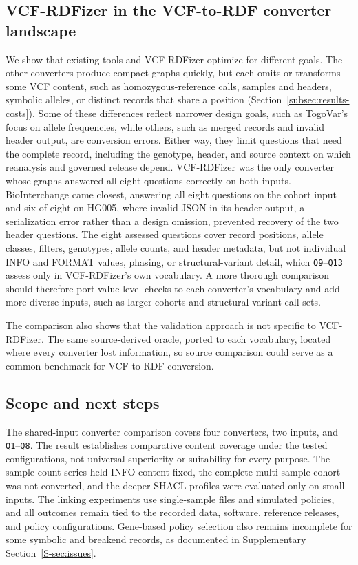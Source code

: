 \documentclass[pdflatex,sn-mathphys-num]{sn-jnl}
\begin{document}
\subsection{VCF-RDFizer in the VCF-to-RDF converter landscape}\label{subsec:other-converters}
We show that existing tools and VCF-RDFizer optimize for different goals.
The other converters produce compact graphs quickly, but each omits or transforms some VCF content, such as homozygous-reference calls, samples and headers, symbolic alleles, or distinct records that share a position (Section~\ref{subsec:results-costs}).
Some of these differences reflect narrower design goals, such as TogoVar's focus on allele frequencies, while others, such as merged records and invalid header output, are conversion errors.
Either way, they limit questions that need the complete record, including the genotype, header, and source context on which reanalysis and governed release depend.
VCF-RDFizer was the only converter whose graphs answered all eight questions correctly on both inputs.
BioInterchange came closest, answering all eight questions on the cohort input and six of eight on HG005, where invalid JSON in its header output, a serialization error rather than a design omission, prevented recovery of the two header questions.
The eight assessed questions cover record positions, allele classes, filters, genotypes, allele counts, and header metadata, but not individual INFO and FORMAT values, phasing, or structural-variant detail, which \texttt{Q9}--\texttt{Q13} assess only in VCF-RDFizer's own vocabulary.
A more thorough comparison should therefore port value-level checks to each converter's vocabulary and add more diverse inputs, such as larger cohorts and structural-variant call sets.

The comparison also shows that the validation approach is not specific to VCF-RDFizer.
The same source-derived oracle, ported to each vocabulary, located where every converter lost information, so source comparison could serve as a common benchmark for VCF-to-RDF conversion.

\subsection{Scope and next steps}\label{subsec:disc-scope}
The shared-input converter comparison covers four converters, two inputs, and \texttt{Q1}--\texttt{Q8}.
The result establishes comparative content coverage under the tested configurations, not universal superiority or suitability for every purpose.
The sample-count series held INFO content fixed, the complete multi-sample cohort was not converted, and the deeper SHACL profiles were evaluated only on small inputs.
The linking experiments use single-sample files and simulated policies, and all outcomes remain tied to the recorded data, software, reference releases, and policy configurations.
Gene-based policy selection also remains incomplete for some symbolic and breakend records, as documented in Supplementary Section~\ref{S-sec:issues}.
\end{document}
